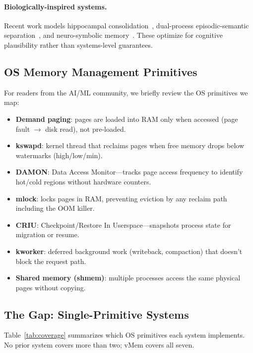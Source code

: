 \documentclass[10pt,twocolumn]{article}
\begin{document}
\paragraph{Biologically-inspired systems.} Recent work models hippocampal consolidation~\cite{humaninspired2026}, dual-process episodic-semantic separation~\cite{episodicsemantic2026}, and neuro-symbolic memory~\cite{neusymms2026}. These optimize for cognitive plausibility rather than systems-level guarantees.

\subsection{OS Memory Management Primitives}

For readers from the AI/ML community, we briefly review the OS primitives we map:

\begin{itemize}[leftmargin=*,nosep]
  \item \textbf{Demand paging}: pages are loaded into RAM only when accessed (page fault $\to$ disk read), not pre-loaded.
  \item \textbf{kswapd}: kernel thread that reclaims pages when free memory drops below watermarks (high/low/min).
  \item \textbf{DAMON}: Data Access Monitor---tracks page access frequency to identify hot/cold regions without hardware counters.
  \item \textbf{mlock}: locks pages in RAM, preventing eviction by any reclaim path including the OOM killer.
  \item \textbf{CRIU}: Checkpoint/Restore In Userspace---snapshots process state for migration or resume.
  \item \textbf{kworker}: deferred background work (writeback, compaction) that doesn't block the request path.
  \item \textbf{Shared memory (shmem)}: multiple processes access the same physical pages without copying.
\end{itemize}

\subsection{The Gap: Single-Primitive Systems}

Table~\ref{tab:coverage} summarizes which OS primitives each system implements. No prior system covers more than two; vMem covers all seven.
\end{document}
